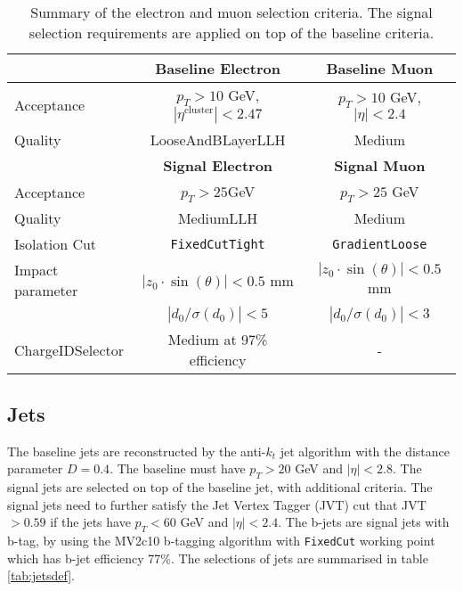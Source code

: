 \begin{table}[htbp]
\begin{center}
\begin{tabular}{|l|c|c|}
\hline
& \textbf{Baseline Electron} & \textbf{Baseline Muon} \\
\hline
\hline
Acceptance     & $p_T > 10$ GeV, $|\eta^{\text{cluster}}| < 2.47$  & $p_T > 10$ GeV, $|\eta| < 2.4$ \\
\hline
Quality & LooseAndBLayerLLH & Medium \\
\hline
\hline
& \textbf{Signal Electron} & \textbf{Signal Muon} \\
\hline
\hline
Acceptance & $p_T > 25$GeV & $p_T > 25$ GeV \\
\hline
Quality & MediumLLH & Medium \\
\hline
Isolation Cut  & \texttt{FixedCutTight} & \texttt{GradientLoose} \\
\hline
Impact parameter & $|z_0 \cdot \sin (\theta)|< 0.5$ mm   & $|z_0 \cdot \sin (\theta)|< 0.5$ mm \\
& $|d_0/\sigma(d_0)|<5$ & $|d_0/\sigma(d_0)| < 3$\\
\hline
ChargeIDSelector & Medium at 97\% efficiency & - \\
\hline
\end{tabular}
\end{center}
\caption{Summary of the electron and muon selection criteria. The signal selection requirements are applied on top of the baseline criteria.}
\label{tab:lepdef}
\end{table}

\subsection{Jets}
The baseline jets are reconstructed by the anti-$k_t$ jet algorithm with the distance parameter $D = 0.4$.
The baseline must have $p_T > 20$ GeV and $|\eta| < 2.8$.
The signal jets are selected on top of the baseline jet, with additional criteria.
The signal jets need to further satisfy the Jet Vertex Tagger (JVT) cut that JVT$> 0.59$ if the jets have $p_T < 60$ GeV and $|\eta| < 2.4$.
The b-jets are signal jets with b-tag, by using the MV2c10 b-tagging algorithm with \texttt{FixedCut} working point which has b-jet efficiency 77\%.
The selections of jets are summarised in table \ref{tab:jetsdef}.

